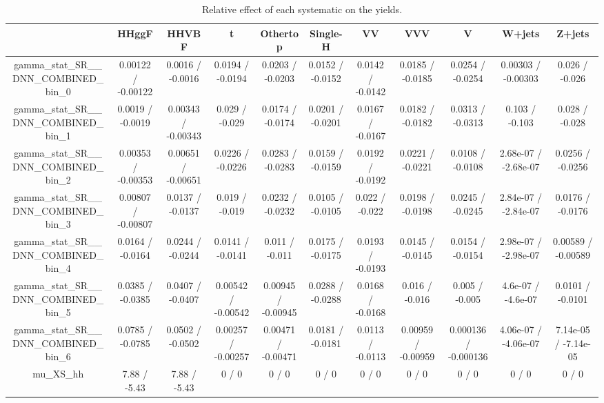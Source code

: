 \documentclass[10pt]{article}
\begin{document}
\begin{table}[htbp]
\begin{center}
\begin{tabular}{|c|c|c|c|c|c|c|c|c|c|c|}
\hline 
      & HHggF      & HHVBF      & t      & Othertop      & Single-H      & VV      & VVV      & V      & W+jets      & Z+jets \\ 
\hline 
  gamma_stat_SR__DNN_COMBINED_bin_0 & 0.00122 / -0.00122 & 0.0016 / -0.0016 & 0.0194 / -0.0194 & 0.0203 / -0.0203 & 0.0152 / -0.0152 & 0.0142 / -0.0142 & 0.0185 / -0.0185 & 0.0254 / -0.0254 & 0.00303 / -0.00303 & 0.026 / -0.026 \\ 
  gamma_stat_SR__DNN_COMBINED_bin_1 & 0.0019 / -0.0019 & 0.00343 / -0.00343 & 0.029 / -0.029 & 0.0174 / -0.0174 & 0.0201 / -0.0201 & 0.0167 / -0.0167 & 0.0182 / -0.0182 & 0.0313 / -0.0313 & 0.103 / -0.103 & 0.028 / -0.028 \\ 
  gamma_stat_SR__DNN_COMBINED_bin_2 & 0.00353 / -0.00353 & 0.00651 / -0.00651 & 0.0226 / -0.0226 & 0.0283 / -0.0283 & 0.0159 / -0.0159 & 0.0192 / -0.0192 & 0.0221 / -0.0221 & 0.0108 / -0.0108 & 2.68e-07 / -2.68e-07 & 0.0256 / -0.0256 \\ 
  gamma_stat_SR__DNN_COMBINED_bin_3 & 0.00807 / -0.00807 & 0.0137 / -0.0137 & 0.019 / -0.019 & 0.0232 / -0.0232 & 0.0105 / -0.0105 & 0.022 / -0.022 & 0.0198 / -0.0198 & 0.0245 / -0.0245 & 2.84e-07 / -2.84e-07 & 0.0176 / -0.0176 \\ 
  gamma_stat_SR__DNN_COMBINED_bin_4 & 0.0164 / -0.0164 & 0.0244 / -0.0244 & 0.0141 / -0.0141 & 0.011 / -0.011 & 0.0175 / -0.0175 & 0.0193 / -0.0193 & 0.0145 / -0.0145 & 0.0154 / -0.0154 & 2.98e-07 / -2.98e-07 & 0.00589 / -0.00589 \\ 
  gamma_stat_SR__DNN_COMBINED_bin_5 & 0.0385 / -0.0385 & 0.0407 / -0.0407 & 0.00542 / -0.00542 & 0.00945 / -0.00945 & 0.0288 / -0.0288 & 0.0168 / -0.0168 & 0.016 / -0.016 & 0.005 / -0.005 & 4.6e-07 / -4.6e-07 & 0.0101 / -0.0101 \\ 
  gamma_stat_SR__DNN_COMBINED_bin_6 & 0.0785 / -0.0785 & 0.0502 / -0.0502 & 0.00257 / -0.00257 & 0.00471 / -0.00471 & 0.0181 / -0.0181 & 0.0113 / -0.0113 & 0.00959 / -0.00959 & 0.000136 / -0.000136 & 4.06e-07 / -4.06e-07 & 7.14e-05 / -7.14e-05 \\ 
  mu_XS_hh & 7.88 / -5.43 & 7.88 / -5.43 & 0 / 0 & 0 / 0 & 0 / 0 & 0 / 0 & 0 / 0 & 0 / 0 & 0 / 0 & 0 / 0 \\ 
\hline 
\end{tabular} 
\caption{Relative effect of each systematic on the yields.} 
\end{center} 
\end{table} 
\end{document}
